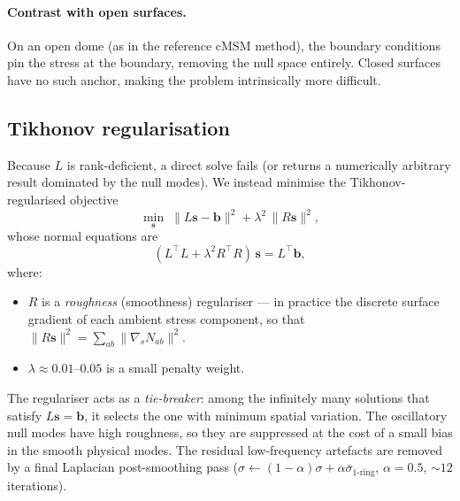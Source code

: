 \documentclass[11pt]{article}
\newcommand{\vv}[1]{\bm{#1}}          %
\begin{document}
\paragraph{Contrast with open surfaces.}  On an open dome (as in the
reference cMSM method), the boundary conditions pin the stress at the
boundary, removing the null space entirely.  Closed surfaces have no
such anchor, making the problem intrinsically more difficult.

\subsection{Tikhonov regularisation}
\label{sec:tikhonov}

Because $L$ is rank-deficient, a direct solve fails (or returns a
numerically arbitrary result dominated by the null modes).  We instead
minimise the Tikhonov-regularised objective
\begin{equation}
  \min_{\vv{s}}\;\bigl\|L\vv{s}-\vv{b}\bigr\|^2
  + \lambda^2\,\bigl\|R\vv{s}\bigr\|^2,
  \label{eq:tikhonovobjective}
\end{equation}
whose normal equations are
\begin{equation}
  (L^\top L + \lambda^2 R^\top R)\,\vv{s} = L^\top\vv{b},
  \label{eq:tikhonov}
\end{equation}
where:
\begin{itemize}[nosep]
  \item $R$ is a \emph{roughness} (smoothness) regulariser — in practice
        the discrete surface gradient of each ambient stress component, so
        that $\|R\vv{s}\|^2=\sum_{ab}\|\nabla_s N_{ab}\|^2$.
  \item $\lambda\approx0.01$--$0.05$ is a small penalty weight.
\end{itemize}

The regulariser acts as a \emph{tie-breaker}: among the infinitely many
solutions that satisfy $L\vv{s}=\vv{b}$, it selects the one with minimum
spatial variation.  The oscillatory null modes have high roughness, so
they are suppressed at the cost of a small bias in the smooth physical
modes.  The residual low-frequency artefacts are removed by a final
Laplacian post-smoothing pass
($\sigma\leftarrow(1-\alpha)\sigma+\alpha\bar\sigma_{1\text{-ring}}$,
$\alpha=0.5$, ${\sim}12$ iterations).
\end{document}

